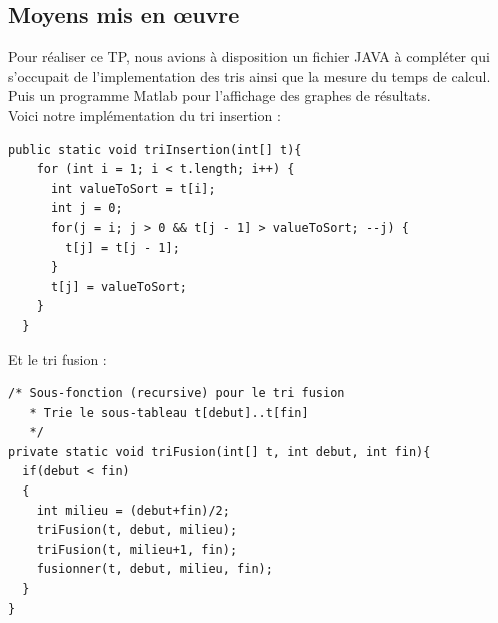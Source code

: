 \documentclass{article}
\begin{document}
\subsection{Moyens mis en \oe uvre}
Pour réaliser ce TP, nous avions à disposition un fichier JAVA à compléter qui s'occupait de l'implementation des tris ainsi que la mesure du temps de calcul. Puis un programme Matlab pour l'affichage des graphes de résultats.\\
Voici notre implémentation du tri insertion :\\
\begin{verbatim}
public static void triInsertion(int[] t){
    for (int i = 1; i < t.length; i++) {
      int valueToSort = t[i];
      int j = 0;
      for(j = i; j > 0 && t[j - 1] > valueToSort; --j) {
        t[j] = t[j - 1];
      }
      t[j] = valueToSort;
    }
  }
\end{verbatim}
Et le tri fusion :
\begin{verbatim}
/* Sous-fonction (recursive) pour le tri fusion
   * Trie le sous-tableau t[debut]..t[fin]
   */
private static void triFusion(int[] t, int debut, int fin){
  if(debut < fin)
  {
    int milieu = (debut+fin)/2;
    triFusion(t, debut, milieu);
    triFusion(t, milieu+1, fin);
    fusionner(t, debut, milieu, fin);
  }
}
\end{verbatim}
\end{document}

